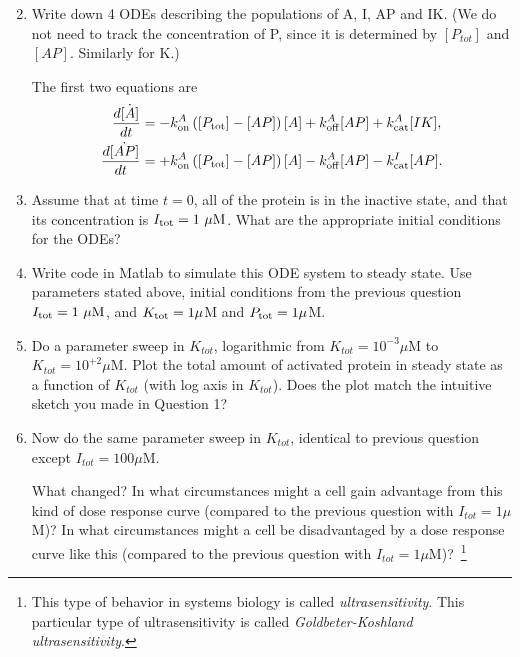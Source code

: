 \documentclass{exam}
\begin{document}
\begin{enumerate}
\setcounter{enumi}{1}
\item Write down 4 ODEs describing the populations of A, I, AP and IK.  (We do not need to track the concentration of P, since it is determined by $[P_{tot}]$ and $[AP]$. Similarly for K.)

The first two equations are
\begin{align}
\frac{d\dot{[A]}}{dt} &= -k_{\rm on}^A \left( [P_{\rm tot}] - [AP]\right) [A] + k_{\rm off}^A [AP] + k_{\rm cat}^A [IK],\\
\frac{d\dot{[AP]}}{dt} &= +k_{\rm on}^A \left( [P_{\rm tot}] - [AP]\right) [A] - k_{\rm off}^A [AP] - k_{\rm cat}^I [AP].
\end{align}

\item Assume that at time $t=0$, all of the protein is in the inactive state, and that its concentration is $I_{\rm tot}=1~\mu\mbox{M}$. What are the appropriate initial conditions for the ODEs?

\item Write code in Matlab to simulate this ODE system to steady state. Use parameters stated above, initial conditions from the previous question   $I_{\rm tot}=1~\mu\mbox{M}$, and $K_{\rm tot}=1\mu$M and $P_{\rm tot}=1\mu$M.

\item Do a parameter sweep in $K_{tot}$, logarithmic from $K_{tot} = 10^{-3} \mu$M to $K_{tot} = 10^{+2} \mu$M. Plot the total amount of activated protein in steady state as a function of $K_{tot}$ (with log axis in $K_{tot}$). Does the plot match the intuitive sketch you made in Question 1? 



\item Now do the same parameter sweep in $K_{tot}$, identical to previous question except $I_{tot}=100\mu$M. 

What changed? In what circumstances might a cell gain advantage from this kind of dose response curve (compared to the previous question with $I_{tot}=1\mu$M)? In what circumstances might a cell be disadvantaged by a dose response curve like this (compared to the previous question with $I_{tot}=1\mu$M)?~\footnote{This type of behavior in systems biology is called \emph{ultrasensitivity}. This particular type of ultrasensitivity is called \emph{Goldbeter-Koshland ultrasensitivity}.}


\end{enumerate}





  
\end{document}
